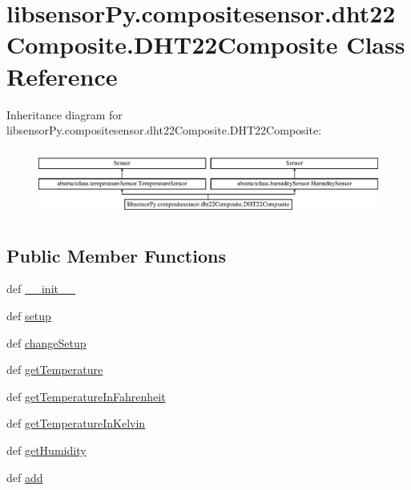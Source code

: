\hypertarget{classlibsensorPy_1_1compositesensor_1_1dht22Composite_1_1DHT22Composite}{}\section{libsensor\+Py.\+compositesensor.\+dht22\+Composite.\+D\+H\+T22\+Composite Class Reference}
\label{classlibsensorPy_1_1compositesensor_1_1dht22Composite_1_1DHT22Composite}
Inheritance diagram for libsensor\+Py.\+compositesensor.\+dht22\+Composite.\+D\+H\+T22\+Composite\+:\begin{figure}[H]
\begin{center}
\leavevmode
\includegraphics[height=2.222222cm]{classlibsensorPy_1_1compositesensor_1_1dht22Composite_1_1DHT22Composite}
\end{center}
\end{figure}
\subsection*{Public Member Functions}
\begin{DoxyCompactItemize}
\item 
def \hyperlink{classlibsensorPy_1_1compositesensor_1_1dht22Composite_1_1DHT22Composite_ac90963e0db55e2593891880ebb4da88c}{\+\_\+\+\_\+init\+\_\+\+\_\+}
\item 
def \hyperlink{classlibsensorPy_1_1compositesensor_1_1dht22Composite_1_1DHT22Composite_af4525bd1b84d1d7241f4054468518c54}{setup}
\item 
def \hyperlink{classlibsensorPy_1_1compositesensor_1_1dht22Composite_1_1DHT22Composite_af95a5b332555af00ba60905b439790cb}{change\+Setup}
\item 
def \hyperlink{classlibsensorPy_1_1compositesensor_1_1dht22Composite_1_1DHT22Composite_a488b7fd9bb6d36c5211c5ca6d40e10c1}{get\+Temperature}
\item 
def \hyperlink{classlibsensorPy_1_1compositesensor_1_1dht22Composite_1_1DHT22Composite_a93b322b5a48625b1accf2124171b5b93}{get\+Temperature\+In\+Fahrenheit}
\item 
def \hyperlink{classlibsensorPy_1_1compositesensor_1_1dht22Composite_1_1DHT22Composite_a9e3a80ebe19ac558c21601099ea94519}{get\+Temperature\+In\+Kelvin}
\item 
def \hyperlink{classlibsensorPy_1_1compositesensor_1_1dht22Composite_1_1DHT22Composite_a94552af604c28cbbebae53d66c77ceb2}{get\+Humidity}
\item 
def \hyperlink{classlibsensorPy_1_1compositesensor_1_1dht22Composite_1_1DHT22Composite_a69a92bf3352514108c41358af87c5843}{add}
\end{DoxyCompactItemize}
